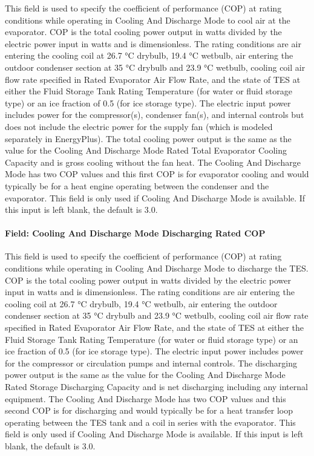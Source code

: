 This field is used to specify the coefficient of performance (COP) at rating conditions while operating in Cooling And Discharge Mode to cool air at the evaporator. COP is the total cooling power output in watts divided by the electric power input in watts and is dimensionless. The rating conditions are air entering the cooling coil at 26.7 °C drybulb, 19.4 °C wetbulb, air entering the outdoor condenser section at 35 °C drybulb and 23.9 °C wetbulb, cooling coil air flow rate specified in Rated Evaporator Air Flow Rate, and the state of TES at either the Fluid Storage Tank Rating Temperature (for water or fluid storage type) or an ice fraction of 0.5 (for ice storage type). The electric input power includes power for the compressor(s), condenser fan(s), and internal controls but does not include the electric power for the supply fan (which is modeled separately in EnergyPlus). The total cooling power output is the same as the value for the Cooling And Discharge Mode Rated Total Evaporator Cooling Capacity and is gross cooling without the fan heat. The Cooling And Discharge Mode has two COP values and this first COP is for evaporator cooling and would typically be for a heat engine operating between the condenser and the evaporator. This field is only used if Cooling And Discharge Mode is available. If this input is left blank, the default is 3.0.

\paragraph{Field: Cooling And Discharge Mode Discharging Rated COP}\label{field-cooling-and-discharge-mode-discharging-rated-cop}

This field is used to specify the coefficient of performance (COP) at rating conditions while operating in Cooling And Discharge Mode to discharge the TES. COP is the total cooling power output in watts divided by the electric power input in watts and is dimensionless. The rating conditions are air entering the cooling coil at 26.7 °C drybulb, 19.4 °C wetbulb, air entering the outdoor condenser section at 35 °C drybulb and 23.9 °C wetbulb, cooling coil air flow rate specified in Rated Evaporator Air Flow Rate, and the state of TES at either the Fluid Storage Tank Rating Temperature (for water or fluid storage type) or an ice fraction of 0.5 (for ice storage type). The electric input power includes power for the compressor or circulation pumps and internal controls. The discharging power output is the same as the value for the Cooling And Discharge Mode Rated Storage Discharging Capacity and is net discharging including any internal equipment. The Cooling And Discharge Mode has two COP values and this second COP is for discharging and would typically be for a heat transfer loop operating between the TES tank and a coil in series with the evaporator. This field is only used if Cooling And Discharge Mode is available. If this input is left blank, the default is 3.0.

